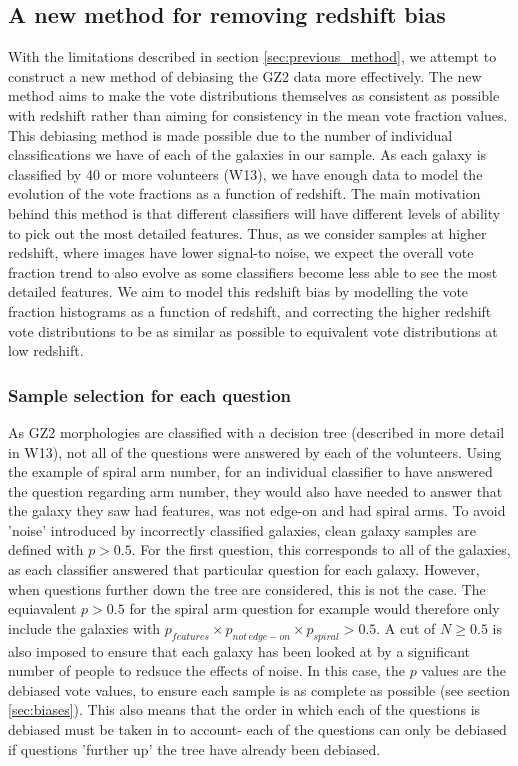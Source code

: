 \documentclass[useAMS,usenatbib]{mn2e}
\begin{document}
\subsection{A new method for removing redshift bias}
\label{sec:new_method}

With the limitations described in section \ref{sec:previous_method}, we attempt to construct a new method of debiasing the GZ2 data more effectively. The new method aims to make the vote distributions themselves as consistent  as possible with redshift rather than aiming for consistency in the mean vote fraction values. This debiasing method is made possible due to the number of individual classifications we have of each of the galaxies in our sample. As each galaxy is classified by 40 or more volunteers (W13), we have enough data to model the evolution of the vote fractions as a function of redshift. The main motivation behind this method is that different classifiers will have different levels of ability to pick out the most detailed features. Thus, as we consider samples at higher redshift, where images have lower signal-to noise, we expect the overall vote fraction trend to also evolve as some classifiers become less able to see the most detailed features. We aim to model this redshift bias by modelling the vote fraction histograms as a function of redshift, and correcting the higher redshift vote distributions to be as similar as possible to equivalent vote distributions at low redshift.

\subsubsection{Sample selection for each question}

As GZ2 morphologies are classified with a decision tree (described in more detail in W13), not all of the questions were answered by each of the volunteers. Using the example of spiral arm number, for an individual classifier to have answered the question regarding arm number, they would also have needed to answer that the galaxy they saw had features, was not edge-on and had spiral arms. To avoid 'noise' introduced by incorrectly classified galaxies, clean galaxy samples are defined with $p > 0.5$. For the first question, this corresponds to all of the galaxies, as each classifier answered that particular question for each galaxy. However, when questions further down the tree are considered, this is not the case. The equiavalent $p>0.5$ for the spiral arm question for example would therefore only include the galaxies with $p_{features} \times p_{not \, edge-on} \times p_{spiral} > 0.5$. A cut of $N \geq 0.5$ is also imposed to ensure that each galaxy has been looked at by a significant number of people to redsuce the effects of noise. In this case, the $p$ values are the debiased vote values, to ensure each sample is as complete as possible (see section \ref{sec:biases}). This also means that the order in which each of the questions is debiased must be taken in to account- each of the questions can only be debiased if questions 'further up' the tree have already been debiased.
\end{document}
